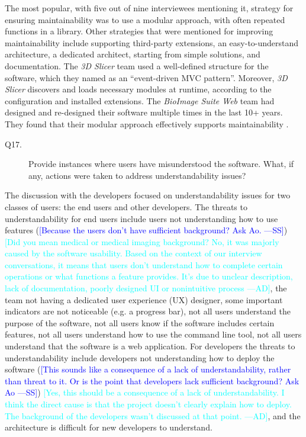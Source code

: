 \documentclass[final, 3p, times, authoryear]{elsarticle}
\newcommand{\authornote}[3]{\textcolor{#1}{[#3 ---#2]}}
\newcommand{\authornote}[3]{}
\newcommand{\wss}[1]{\authornote{blue}{SS}{#1}} %
\newcommand{\ad}[1]{\authornote{cyan}{AD}{#1}} %
\begin{document}
The most popular, with five out of nine interviewees mentioning it, strategy for
ensuring maintainability was to use a modular approach, with often repeated
functions in a library.  Other strategies that were mentioned for improving
maintainability include supporting third-party extensions, an easy-to-understand
architecture, a dedicated architect, starting from simple solutions, and
documentation.  The \textit{3D Slicer} team used a well-defined structure for
the software, which they named as an ``event-driven MVC pattern''. Moreover,
\textit{3D Slicer} discovers and loads necessary modules at runtime, according
to the configuration and installed extensions. The \textit{BioImage Suite Web}
team had designed and re-designed their software multiple times in the last 10+
years. They found that their modular approach effectively supports
maintainability \citep{Joshi2011}. 

\begin{description}
\item[Q17.] Provide instances where users have misunderstood the software. What,
if any, actions were taken to address understandability issues?
\end{description}

The discussion with the developers focused on understandability issues for two
classes of users: the end users and other developers.  The threats to
understandability for end users include users not understanding how to use
features (\wss{Because the users don't have sufficient background?  Ask Ao.})
\ad{Did you mean medical or medical imaging background? No, it was majorly
caused by the software usability. Based on the context of our interview
conversations, it means that users don't understand how to complete certain
operations or what functions a feature provides. It's due to unclear description,
lack of documentation, poorly designed UI or nonintuitive process},
the team not having a dedicated user experience (UX) designer, some important
indicators are not noticeable (e.g. a progress bar), not all users understand
the purpose of the software, not all users know if the software includes certain
features, not all users understand how to use the command line tool, not all
users understand that the software is a web application. For developers the
threats to understandability include developers not understanding how to deploy
the software (\wss{This sounds like a consequence of a lack of
understandability, rather than threat to it.  Or is the point that developers
lack sufficient background?  Ask Ao}) \ad{Yes, this should be a consequence of a
lack of understandability. I think the direct cause is that the project doesn't
clearly explain how to deploy. The background of the developers wasn't discussed
at that point.}, and the architecture is difficult for new
developers to understand.
\end{document}
